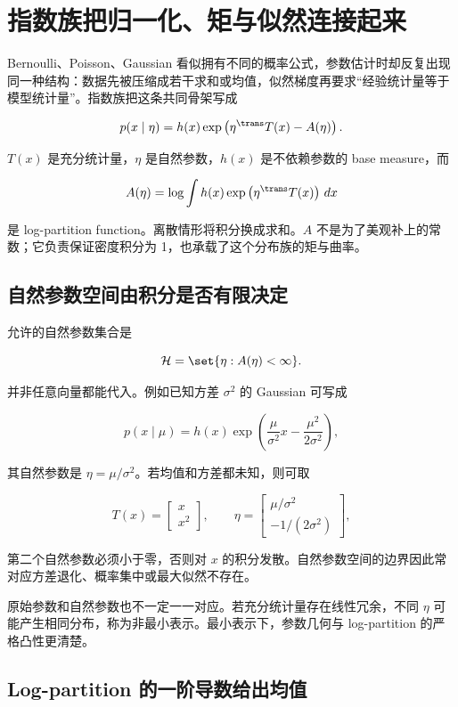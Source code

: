 \section{指数族把归一化、矩与似然连接起来}

Bernoulli、Poisson、Gaussian 看似拥有不同的概率公式，参数估计时却反复出现同一种结构：数据先被压缩成若干求和或均值，似然梯度再要求“经验统计量等于模型统计量”。指数族把这条共同骨架写成

\[
p(x\mid\eta)
=h(x)
\exp\left(
\eta^{\trans}T(x)-A(\eta)
\right).
\]

\(T(x)\) 是充分统计量，\(\eta\) 是自然参数，\(h(x)\) 是不依赖参数的 base measure，而

\[
A(\eta)
=\log\int
h(x)\exp\left(
\eta^{\trans}T(x)
\right)\,dx
\]

是 log-partition function。离散情形将积分换成求和。\(A\) 不是为了美观补上的常数；它负责保证密度积分为 1，也承载了这个分布族的矩与曲率。

\subsection{自然参数空间由积分是否有限决定}

允许的自然参数集合是

\[
\mathcal H
=\set{
\eta:
A(\eta)<\infty
}.
\]

并非任意向量都能代入。例如已知方差 \(\sigma^2\) 的 Gaussian 可写成

\[
p(x\mid\mu)
=h(x)
\exp\left(
\frac{\mu}{\sigma^2}x
-\frac{\mu^2}{2\sigma^2}
\right),
\]

其自然参数是 \(\eta=\mu/\sigma^2\)。若均值和方差都未知，则可取

\[
T(x)=
\begin{bmatrix}
x\\x^2
\end{bmatrix},
\qquad
\eta=
\begin{bmatrix}
\mu/\sigma^2\\
-1/(2\sigma^2)
\end{bmatrix},
\]

第二个自然参数必须小于零，否则对 \(x\) 的积分发散。自然参数空间的边界因此常对应方差退化、概率集中或最大似然不存在。

原始参数和自然参数也不一定一一对应。若充分统计量存在线性冗余，不同 \(\eta\) 可能产生相同分布，称为非最小表示。最小表示下，参数几何与 log-partition 的严格凸性更清楚。

\subsection{Log-partition 的一阶导数给出均值}

